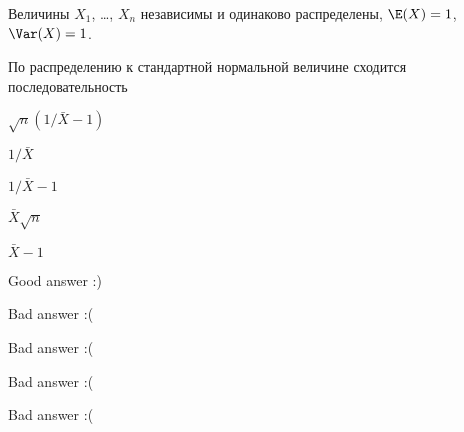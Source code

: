 
\begin{question}
Величины \(X_1\), \ldots, \(X_n\) независимы и одинаково распределены,
\(\E(X)=1\), \(\Var(X)=1\).

По распределению к стандартной нормальной величине сходится
последовательность
\begin{answerlist}
  \item \(\sqrt{n}(1/\bar X-1)\)
  \item \(1/\bar X\)
  \item \(1/\bar X -1\)
  \item \(\bar X \sqrt{n}\)
  \item \(\bar X-1\)
\end{answerlist}
\end{question}

\begin{solution}
\begin{answerlist}
  \item Good answer :)
  \item Bad answer :(
  \item Bad answer :(
  \item Bad answer :(
  \item Bad answer :(
\end{answerlist}
\end{solution}

